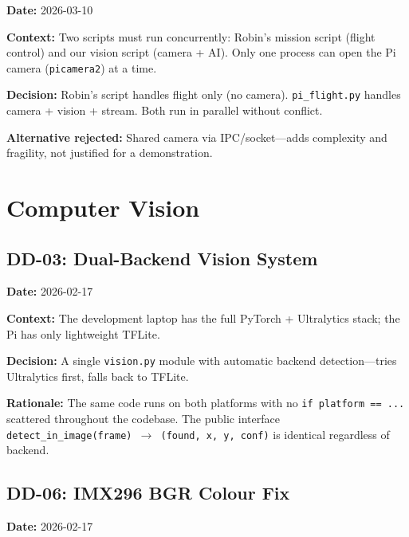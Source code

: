 \documentclass[10pt,a4paper]{article}
\newcommand{\ddlabel}[1]{\textbf{\color{headblue}#1}\hspace{0.5em}}
\begin{document}
\ddlabel{Date:} 2026-03-10

\ddlabel{Context:} Two scripts must run concurrently: Robin's mission script (flight control) and our vision script (camera + AI). Only one process can open the Pi camera (\texttt{picamera2}) at a time.

\begin{decisionbox}
\textbf{Decision:} Robin's script handles flight only (no camera). \texttt{pi\_flight.py} handles camera + vision + stream. Both run in parallel without conflict.
\end{decisionbox}

\ddlabel{Alternative rejected:} Shared camera via IPC/socket---adds complexity and fragility, not justified for a demonstration.

\section{Computer Vision}

\subsection{DD-03: Dual-Backend Vision System}
\label{sec:dd03}

\ddlabel{Date:} 2026-02-17

\ddlabel{Context:} The development laptop has the full PyTorch + Ultralytics stack; the Pi has only lightweight TFLite.

\begin{decisionbox}
\textbf{Decision:} A single \texttt{vision.py} module with automatic backend detection---tries Ultralytics first, falls back to TFLite.
\end{decisionbox}

\ddlabel{Rationale:} The same code runs on both platforms with no \texttt{if platform == ...} scattered throughout the codebase. The public interface \texttt{detect\_in\_image(frame) $\rightarrow$ (found, x, y, conf)} is identical regardless of backend.

\subsection{DD-06: IMX296 BGR Colour Fix}
\label{sec:dd06}

\ddlabel{Date:} 2026-02-17
\end{document}

